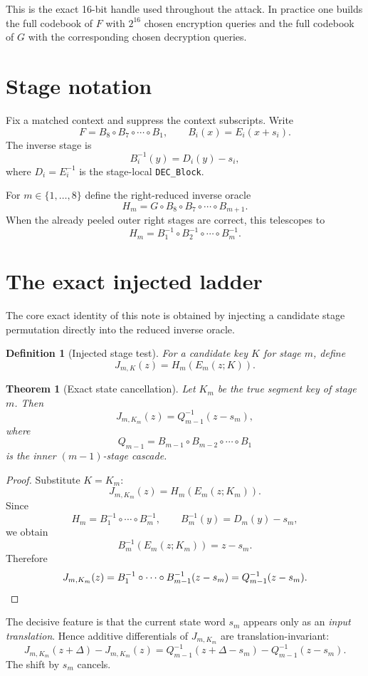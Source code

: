 \documentclass[11pt]{article}
\newtheorem{theorem}{Theorem}
\newtheorem{definition}{Definition}
\begin{document}
This is the exact 16-bit handle used throughout the attack. In practice one builds the full codebook of $F$ with $2^{16}$ chosen encryption queries and the full codebook of $G$ with the corresponding chosen decryption queries.

\section{Stage notation}
Fix a matched context and suppress the context subscripts. Write
\[
F = B_8\circ B_7\circ \cdots \circ B_1,
\qquad
B_i(x)=E_i(x+s_i).
\]
The inverse stage is
\[
B_i^{-1}(y)=D_i(y)-s_i,
\]
where $D_i=E_i^{-1}$ is the stage-local \texttt{DEC\_Block}.

For $m\in\{1,\dots,8\}$ define the right-reduced inverse oracle
\[
H_m = G\circ B_8\circ B_7\circ\cdots\circ B_{m+1}.
\]
When the already peeled outer right stages are correct, this telescopes to
\[
H_m = B_1^{-1}\circ B_2^{-1}\circ\cdots\circ B_m^{-1}.
\]

\section{The exact injected ladder}
The core exact identity of this note is obtained by injecting a candidate stage permutation directly into the reduced inverse oracle.

\begin{definition}[Injected stage test]
For a candidate key $K$ for stage $m$, define
\[
J_{m,K}(z)=H_m(E_m(z;K)).
\]
\end{definition}

\begin{theorem}[Exact state cancellation]
Let $K_m$ be the true segment key of stage $m$. Then
\[
J_{m,K_m}(z)=Q_{m-1}^{-1}(z-s_m),
\]
where
\[
Q_{m-1}=B_{m-1}\circ B_{m-2}\circ\cdots\circ B_1
\]
is the inner $(m-1)$-stage cascade.
\end{theorem}

\begin{proof}
Substitute $K=K_m$:
\[
J_{m,K_m}(z)=H_m(E_m(z;K_m)).
\]
Since
\[
H_m = B_1^{-1}\circ \cdots \circ B_m^{-1},
\qquad
B_m^{-1}(y)=D_m(y)-s_m,
\]
we obtain
\[
B_m^{-1}(E_m(z;K_m))=z-s_m.
\]
Therefore
\[
J_{m,K_m}(z)=B_1^{-1}\circ\cdots\circ B_{m-1}^{-1}(z-s_m)=Q_{m-1}^{-1}(z-s_m).
\qedhere
\]
\end{proof}

The decisive feature is that the current state word $s_m$ appears only as an \emph{input translation}. Hence additive differentials of $J_{m,K_m}$ are translation-invariant:
\[
J_{m,K_m}(z+\Delta)-J_{m,K_m}(z)
=
Q_{m-1}^{-1}(z+\Delta-s_m)-Q_{m-1}^{-1}(z-s_m).
\]
The shift by $s_m$ cancels.
\end{document}
